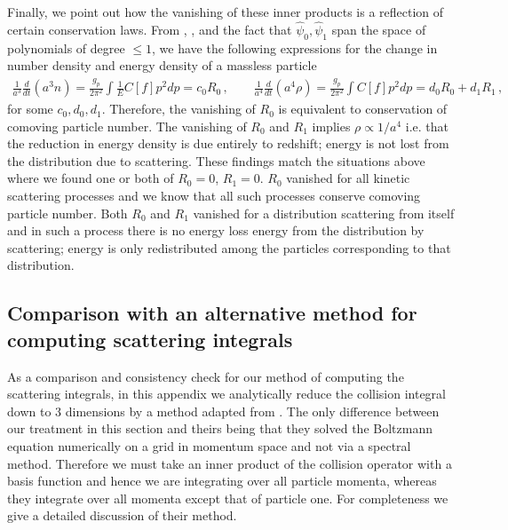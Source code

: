 Finally, we point out how the vanishing of these inner products is a reflection of certain conservation laws. From , , and the fact that $\hat\psi_0,\hat\psi_1$ span the space of polynomials of degree $\leq 1$, we have the following expressions for the change in number density and energy density of a massless particle
\begin{align}
\frac{1}{a^3} \frac{d}{dt}(a^3n)= \frac{g_p}{2\pi^2}\int \frac{1}{E}C[f]p^2dp=c_0 R_0\,,\qquad
\frac{1}{a^4}\frac{d}{dt}(a^4\rho)= \frac{g_p}{2\pi^2}\int C[f] p^2dp=d_0R_0+d_1R_1\,, 
\end{align}
for some $c_0,d_0,d_1$. Therefore, the vanishing of $R_0$ is equivalent to conservation of comoving particle number.  The vanishing of $R_0$ and $R_1$ implies $\rho\propto 1/a^4$ i.e. that the reduction in energy density is due entirely to redshift; energy is not lost from the distribution due to scattering.  These findings match the situations above where we found one or both of $R_0=0$, $R_1=0$.  $R_0$ vanished for all kinetic scattering processes and we know that all such processes conserve comoving particle number.  Both $R_0$ and $R_1$ vanished for a distribution scattering from itself and in such a process  there is no energy loss energy  from the distribution by scattering; energy is only redistributed among the particles corresponding to that distribution.



\subsection{Comparison with an alternative method for computing scattering integrals}\label{app:dogovMethod}
As a comparison and consistency check for our method of computing the scattering integrals, in this appendix we analytically reduce the collision integral down to $3$ dimensions by a method adapted from \cite{Dolgov:1997mb,Dolgov:1998sf}.  The only difference between our treatment in this section and theirs being that they solved the Boltzmann equation numerically on a grid in momentum space and not via a spectral method.  Therefore we must take an inner product of the collision operator with a basis function and hence we are integrating over all particle momenta, whereas they integrate over all momenta except that of particle one.  For completeness we give a detailed discussion of their method.

